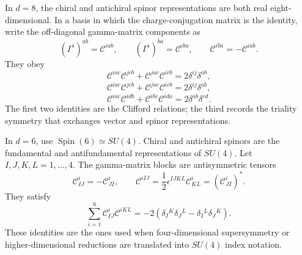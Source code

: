 In \(d=8\), the chiral and antichiral spinor representations are both real
eight-dimensional.  In a basis in which the charge-conjugation matrix is the
identity, write the off-diagonal gamma-matrix components as
\[
  (\Gamma^i)^{a\dot b}=\mathcal C^{i a\dot b},
  \qquad
  (\Gamma^i)^{\dot b a}=\mathcal C^{i\dot b a},
  \qquad
  \mathcal C^{i\dot b a}=-\mathcal C^{i a\dot b}.
\]
They obey
\[
  \mathcal C^{i a\dot c}\mathcal C^{j\dot c b}
  +
  \mathcal C^{j a\dot c}\mathcal C^{i\dot c b}
  =
  2\delta^{ij}\delta^{ab},
\]
\[
  \mathcal C^{i\dot a c}\mathcal C^{j c\dot b}
  +
  \mathcal C^{j\dot a c}\mathcal C^{i c\dot b}
  =
  2\delta^{ij}\delta^{\dot a\dot b},
\]
\[
  \mathcal C^{i a\dot c}\mathcal C^{i\dot d b}
  +
  \mathcal C^{i b\dot c}\mathcal C^{i\dot d a}
  =
  2\delta^{ab}\delta^{\dot c\dot d}.
\]
The first two identities are the Clifford relations; the third records the
triality symmetry that exchanges vector and spinor representations.

In \(d=6\), use \(\operatorname{Spin}(6)\simeq SU(4)\).  Chiral and
antichiral spinors are the fundamental and antifundamental representations
of \(SU(4)\).  Let \(I,J,K,L=1,\ldots,4\).  The gamma-matrix blocks are
antisymmetric tensors
\[
  \mathcal C^i_{IJ}=-\mathcal C^i_{JI},
  \qquad
  \mathcal C^{iIJ}
  =
  \frac12\epsilon^{IJKL}\mathcal C^i_{KL}
  =
  \left(\mathcal C^i_{JI}\right)^* .
\]
They satisfy
\[
  \sum_{i=1}^6
  \mathcal C^i_{IJ}\mathcal C^{iKL}
  =
  -2
  \left(\delta_I{}^K\delta_J{}^L-\delta_I{}^L\delta_J{}^K\right).
\]
These identities are the ones used when four-dimensional supersymmetry or
higher-dimensional reductions are translated into \(SU(4)\) index notation.

